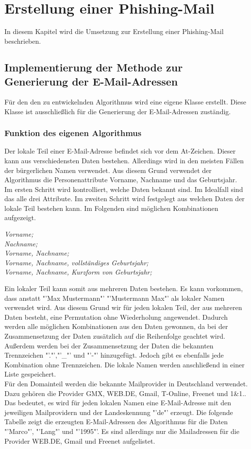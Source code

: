 
\chapter{Erstellung einer Phishing-Mail}  %
\label{cha:ErstellungeinerPhishing-Mail} %
In diesem Kapitel wird die Umsetzung zur Erstellung einer Phishing-Mail beschrieben.

\section{Implementierung der Methode zur Generierung der E-Mail-Adressen}	
Für den den zu entwickelnden Algorithmus wird eine eigene Klasse erstellt. Diese Klasse ist ausschließlich für die Generierung der E-Mail-Adressen zuständig.
	\subsection{Funktion des eigenen Algorithmus}
	Der lokale Teil einer E-Mail-Adresse befindet sich vor dem At-Zeichen. Dieser kann aus verschiedensten Daten bestehen. Allerdings wird in den meisten Fällen der bürgerlichen Namen verwendet. \cite{NameAlsEMail} Aus diesem Grund verwendet der Algorithmus die Personenattribute Vorname, Nachname und das Geburtsjahr.\\
	Im ersten Schritt wird kontrolliert, welche Daten bekannt sind. Im Idealfall sind das alle drei Attribute. Im zweiten Schritt wird festgelegt aus welchen Daten der lokale Teil bestehen kann. Im Folgenden sind möglichen Kombinationen aufgezeigt.
	
	\textit{Vorname;}\\
	\textit{Nachname;}\\
	\textit{Vorname, Nachname;}\\
	\textit{Vorname, Nachname, vollständiges Geburtsjahr;}\\
	\textit{Vorname, Nachname, Kurzform von Geburtsjahr;}
	
	Ein lokaler Teil kann somit aus mehreren Daten bestehen. Es kann vorkommen, dass anstatt "'Max Mustermann"' "'Mustermann Max"' als lokaler Namen verwendet wird. Aus diesem Grund wir für jeden lokalen Teil, der aus mehreren Daten besteht, eine Permutation ohne Wiederholung angewendet. Dadurch werden alle möglichen Kombinationen aus den Daten gewonnen, da bei der Zusammensetzung der Daten zusätzlich auf die Reihenfolge geachtet wird. Außerdem werden bei der Zusammensetzung der Daten die bekannten Trennzeichen "'."',"'\_"' und "'-"' hinzugefügt. Jedoch gibt es ebenfalls jede Kombination ohne Trennzeichen. Die lokale Namen werden anschließend in einer Liste gespeichert.\\
	Für den Domainteil werden die bekannte Mailprovider in Deutschland verwendet.  Dazu gehören die Provider GMX, WEB.DE, Gmail, T-Online, Freenet und 1\&1.\cite{AnbieterMail}. Das bedeutet, es wird für jeden lokalen Namen eine E-Mail-Adresse mit den jeweiligen Mailprovidern und der Landeskennung "'de"' erzeugt. Die folgende Tabelle  zeigt die erzeugten E-Mail-Adressen des Algorithmus für die Daten "'Marco"', "'Lang"' und "'1995"'. Es sind allerdings nur die Mailadressen für die Provider WEB.DE, Gmail und Freenet aufgelistet.
	
